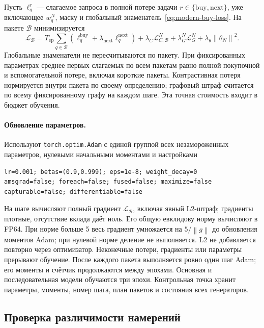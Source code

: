\documentclass[12pt,a4paper]{article}
\newcommand{\code}[1]{{\ttfamily\small\nolinkurl{#1}}}
\newcommand{\norm}[1]{\left\lVert#1\right\rVert}
\theoremstyle{plainru}
\begin{document}
Пусть $\ell_q^r$ --- слагаемое запроса в полной потере задачи
$r\in\{\mathrm{buy},\mathrm{next}\}$, уже включающее $w_q^N$,
маску и глобальный знаменатель~\eqref{eq:modern-buy-loss}.
На пакете $\mathcal B$ минимизируется
\begin{equation}\label{eq:modern-batch-loss}
\mathcal L_{\mathcal B}
=T_{\mathrm{ep}}\sum_{q\in\mathcal B}
(\ell_q^{\mathrm{buy}}+\lambda_{\mathrm{next}}\ell_q^{\mathrm{next}})
+\lambda_C\mathcal L_{C,\mathcal B}^N
+\lambda_G^N\mathcal L_G^N+\lambda_\theta\norm{\theta_N}^2.
\end{equation}
Глобальные знаменатели не пересчитываются по пакету.
При фиксированных параметрах среднее первых слагаемых по всем пакетам
равно полной покупочной и вспомогательной потере, включая короткие
пакеты. Контрастивная потеря нормируется внутри пакета по своему
определению; графовый штраф считается по всему фиксированному графу
на каждом шаге. Эта точная стоимость входит в бюджет обучения.

\paragraph{Обновление параметров.}
Используют \code{torch.optim.Adam} с единой группой всех незамороженных
параметров, нулевыми начальными моментами и настройками
\begin{verbatim}
lr=0.001; betas=(0.9,0.999); eps=1e-8; weight_decay=0
amsgrad=false; foreach=false; fused=false; maximize=false
capturable=false; differentiable=false
\end{verbatim}
На шаге вычисляют полный градиент $\mathcal L_{\mathcal B}$, включая
явный L2-штраф; градиенты плотные, отсутствие вклада даёт ноль.
Его общую евклидову норму вычисляют в FP64. При норме больше 5
весь градиент умножается на $5/\norm{g}$ до обновления моментов Adam;
при нулевой норме деление не выполняется. L2 не добавляется повторно
через оптимизатор. Неконечные потери, градиенты или параметры прерывают
обучение. После каждого пакета выполняется ровно один шаг Adam;
его моменты и счётчик продолжаются между эпохами.
Основная и последовательная модели обучаются три эпохи.
Контрольная точка хранит параметры, моменты, номер шага, план пакетов
и состояния всех генераторов.

\subsection{Проверка различимости намерений}
\label{sec:modern-intent-diagnostics}
\end{document}
